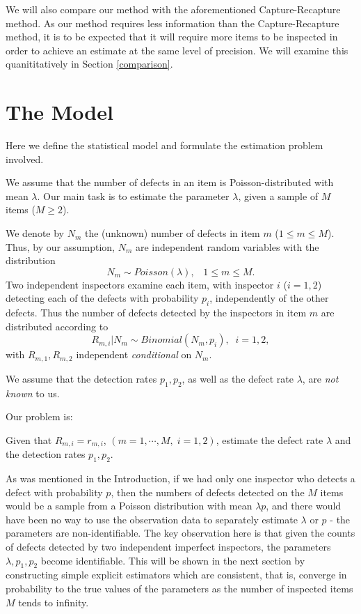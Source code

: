 \documentclass[a4paper,10pt,twoside]{article}
\begin{document}
We will also compare our method with the aforementioned Capture-Recapture method. As our method requires less
information than the Capture-Recapture method, it is to be expected that it will require more items to be inspected in order to 
achieve an estimate at the same level of precision. We will examine this quanititatively in Section \ref{comparison}.


\section{The Model}
\label{model}

Here we define the statistical model and formulate the estimation problem involved.

We assume that the number of defects in an item is Poisson-distributed with mean $\lambda$. 
Our main task is to estimate the parameter $\lambda$, given a sample of $M$ items ($M\geq 2$).

We denote by $N_m$ the (unknown) number of defects in item $m$ ($1\leq m\leq M$). Thus, by our assumption,
$N_m$ are independent random variables with the distribution
\begin{equation}\label{poi1}N_m\sim Poisson(\lambda),\;\;\;1\leq m\leq M.\end{equation}
Two independent inspectors examine each item, with inspector $i$ ($i=1,2$)  detecting each of the defects with probability $p_i$, independently of the other defects.
Thus the number of defects detected by the inspectors in item $m$ are distributed according to
\begin{equation}\label{poi2}R_{m,i}|N_{m}\sim Binomial (N_m,p_i),\;\;i=1,2,\end{equation}
with $R_{m,1},R_{m,2}$ independent {\it{conditional}} on $N_m$.

We assume that the detection rates $p_1,p_2$, as well as the defect rate $\lambda$, are {\it{not known}} to us. 

Our problem is:
\begin{center}
	Given that 
	$R_{m,i}=r_{m,i}$, $(m=1,\cdots, M, \;i=1,2)$,
	estimate the defect rate $\lambda$ and the detection rates $p_1,p_2$.
\end{center}

As was mentioned in the Introduction, if we had only one inspector who detects a defect with probability $p$, then
the numbers of defects detected on the $M$ items would be a sample from a Poisson distribution with mean $\lambda p$, and there would have been no
way to use the observation data to separately estimate $\lambda$ or $p$ - the parameters are non-identifiable.
The key observation here is that given the counts of defects detected by two independent imperfect inspectors, the parameters 
$\lambda,p_1,p_2$ become identifiable. This will be shown in the next section by constructing simple explicit estimators which are consistent,
that is, converge in probability to the true values of the parameters as the number of inspected items $M$ tends to infinity.
\end{document}
